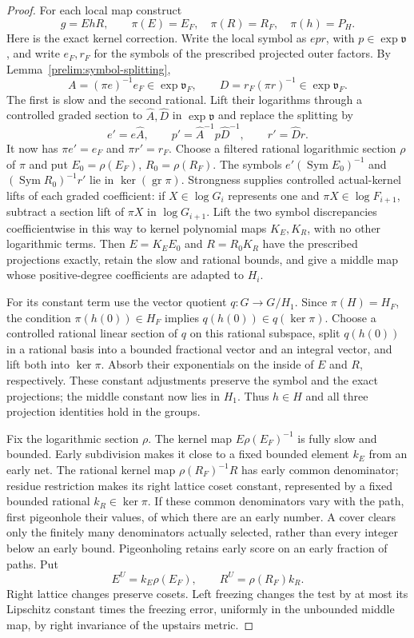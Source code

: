 \begin{proof}
For each local map construct
\[
 g=EhR,\qquad \pi(E)=E_F,\quad\pi(R)=R_F,\quad\pi(h)=P_H.
\]
Here is the exact kernel correction.  Write the local symbol as
$epr$, with $p\in\exp\mathfrak v$, and write $e_F,r_F$ for the
symbols of the prescribed projected outer factors.  By
Lemma~\ref{prelim:symbol-splitting},
\[
 A=(\pi e)^{-1}e_F\in\exp\mathfrak v_F,
 \qquad D=r_F(\pi r)^{-1}\in\exp\mathfrak v_F.
\]
The first is slow and the second rational.  Lift their logarithms
through a controlled graded section to $\widehat A,\widehat D$ in
$\exp\mathfrak v$ and replace the splitting by
\[
 e'=e\widehat A,\qquad
 p'=\widehat A^{-1}p\widehat D^{-1},\qquad
 r'=\widehat D r.
\]
It now has $\pi e'=e_F$ and $\pi r'=r_F$.  Choose a filtered
rational logarithmic section $\rho$ of $\pi$ and put
$E_0=\rho(E_F)$, $R_0=\rho(R_F)$.  The symbols
$e'(\operatorname{Sym}E_0)^{-1}$ and
$(\operatorname{Sym}R_0)^{-1}r'$ lie in
$\ker(\operatorname{gr}\pi)$.  Strongness supplies controlled
actual-kernel lifts of each graded coefficient: if
$X\in\log G_i$ represents one and $\pi X\in\log F_{i+1}$,
subtract a section lift of $\pi X$ in $\log G_{i+1}$.
Lift the two symbol discrepancies coefficientwise in this way to
kernel polynomial maps $K_E,K_R$, with no other logarithmic terms.
Then $E=K_EE_0$ and $R=R_0K_R$ have the prescribed projections
exactly, retain the slow and rational bounds, and give a middle map
whose positive-degree coefficients are adapted to $H_i$.

For its constant term use the vector quotient $q:G\to G/H_1$.
Since $\pi(H)=H_F$, the condition $\pi(h(0))\in H_F$ implies
$q(h(0))\in q(\ker\pi)$.  Choose a controlled rational linear
section of $q$ on this rational subspace, split $q(h(0))$ in a
rational basis into a bounded fractional vector and an integral
vector, and lift both into $\ker\pi$.  Absorb their exponentials
on the inside of $E$ and $R$, respectively.  These constant
adjustments preserve the symbol and the exact projections; the
middle constant now lies in $H_1$.  Thus $h\in H$ and all three
projection identities hold in the groups.

Fix the logarithmic section $\rho$.  The kernel map
$E\rho(E_F)^{-1}$ is fully slow and bounded.  Early subdivision
makes it close to a fixed bounded element $k_E$ from an early net.
The rational kernel map $\rho(R_F)^{-1}R$ has early common
denominator; residue restriction makes its right lattice coset
constant, represented by a fixed bounded rational $k_R\in\ker\pi$.
If these common denominators vary with the path, first pigeonhole
their values, of which there are an early number.  A cover clears
only the finitely many denominators actually selected, rather than
every integer below an early bound.
Pigeonholing retains early score on an early fraction of paths.  Put
\[
              E^U=k_E\rho(E_F),\qquad R^U=\rho(R_F)k_R.
\]
Right lattice changes preserve cosets.  Left freezing changes the
test by at most its Lipschitz constant times the freezing error,
uniformly in the unbounded middle map, by right invariance of the
upstairs metric.


\end{proof}
